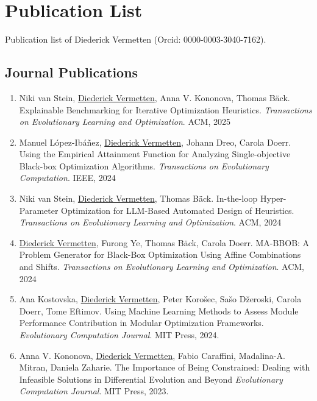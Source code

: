 \section{Publication List}

Publication list of Diederick Vermetten (Orcid: 0000-0003-3040-7162). 

\subsection*{Journal Publications}
    \begin{enumerate}
    \item Niki van Stein, \underline{Diederick Vermetten}, Anna V. Kononova, Thomas B\"ack. Explainable Benchmarking for Iterative Optimization Heuristics. 
    \emph{Transactions on Evolutionary Learning and Optimization}. ACM, 2025
       
    \item Manuel López-Ibáñez, \underline{Diederick Vermetten}, Johann Dreo, Carola Doerr. Using the Empirical Attainment Function for Analyzing Single-objective Black-box Optimization Algorithms.
    \emph{Transactions on Evolutionary Computation}. IEEE, 2024

    \item Niki van Stein, \underline{Diederick Vermetten}, Thomas B\"ack. In-the-loop Hyper-Parameter Optimization for LLM-Based Automated Design of Heuristics.
    \emph{Transactions on Evolutionary Learning and Optimization}. ACM, 2024
        
    \item \underline{Diederick Vermetten}, Furong Ye, Thomas Bäck, Carola Doerr. MA-BBOB: A Problem Generator for Black-Box Optimization Using Affine Combinations and Shifts.
    \emph{Transactions on Evolutionary Learning and Optimization}. ACM, 2024
    
    \item Ana Kostovska, \underline{Diederick Vermetten}, Peter Koro\v{s}ec, Sa\v{s}o D\v{z}eroski, Carola Doerr, Tome Eftimov. Using Machine Learning Methods to Assess Module Performance Contribution in Modular Optimization Frameworks.
    \emph{Evolutionary Computation Journal}. MIT Press, 2024.
    
 	\item Anna V. Kononova, \underline{Diederick Vermetten}, Fabio Caraffini, Madalina-A. Mitran, Daniela Zaharie. The Importance of Being Constrained: Dealing with Infeasible Solutions in Differential Evolution and Beyond
    \emph{Evolutionary Computation Journal}. MIT Press, 2023.
 	

\end{enumerate}
